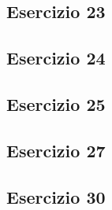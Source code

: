 \subsection{Esercizio 23}


\subsection{Esercizio 24}


\subsection{Esercizio 25}


\subsection{Esercizio 27}


\subsection{Esercizio 30}

